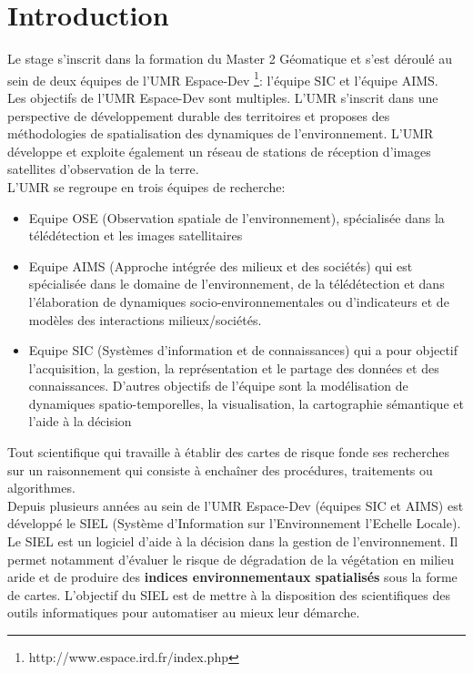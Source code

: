 \chapter{Introduction} 
\label{Introduction}

Le stage s'inscrit dans la formation du Master 2 Géomatique et s'est déroulé au sein de deux équipes de l'UMR Espace-Dev \footnote{http://www.espace.ird.fr/index.php}: l'équipe SIC et l'équipe AIMS.\\
 
Les objectifs de l'UMR Espace-Dev sont multiples. L'UMR s'inscrit dans une perspective de développement durable des territoires et proposes des méthodologies de spatialisation des dynamiques de l'environnement. L'UMR développe et exploite également un réseau de stations de réception d'images satellites d'observation de la terre.\\

L'UMR se regroupe en trois équipes de recherche: \\
\begin{itemize}
\item Equipe OSE (Observation spatiale de l'environnement), spécialisée dans la télédétection et les images satellitaires
\item Equipe AIMS (Approche intégrée des milieux et des sociétés) qui est spécialisée dans le domaine de l'environnement, de la  télédétection et dans l'élaboration de dynamiques socio-environnementales ou d'indicateurs et de modèles des interactions milieux/sociétés.
\item Equipe SIC (Systèmes d'information et de connaissances) qui a pour objectif l'acquisition, la gestion, la représentation et le partage des données et des connaissances. D'autres objectifs de l'équipe sont la modélisation de dynamiques spatio-temporelles, la visualisation, la cartographie sémantique et l'aide à la décision\\

\end{itemize}

Tout scientifique qui travaille à établir des cartes de risque fonde ses recherches sur un raisonnement qui consiste à enchaîner des procédures, traitements ou algorithmes. \\

Depuis plusieurs années  au sein de l'UMR Espace-Dev (équipes SIC et AIMS) est développé le SIEL (Système d'Information sur l'Environnement l'Echelle Locale). Le SIEL est un logiciel d'aide à la décision dans la gestion de l'environnement. Il permet notamment d'évaluer le risque de dégradation de la végétation en milieu aride et de produire des \textbf{indices environnementaux spatialisés} sous la forme de cartes. L'objectif du SIEL est de mettre à la disposition des scientifiques des outils informatiques pour automatiser au mieux leur démarche.\\

